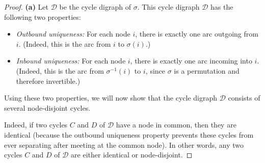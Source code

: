 \begin{proof}
\leanok
\textbf{(a)} Let $\mathcal{D}$ be the cycle digraph of $\sigma$.
This cycle digraph $\mathcal{D}$ has the following two properties:

\begin{itemize}
\item \textit{Outbound uniqueness:} For each node $i$, there is exactly one
arc outgoing from $i$. (Indeed, this is the arc from $i$ to $\sigma\left(
i\right)  $.)

\item \textit{Inbound uniqueness:} For each node $i$, there is exactly one arc
incoming into $i$. (Indeed, this is the arc from $\sigma^{-1}\left(  i\right)
$ to $i$, since $\sigma$ is a permutation and therefore invertible.)
\end{itemize}

Using these two properties, we will now show that the cycle digraph
$\mathcal{D}$ consists of several node-disjoint cycles.

Indeed, if two cycles $C$ and $D$ of
$\mathcal{D}$ have a node in common, then they are identical
(because the outbound
uniqueness property prevents these cycles from ever separating after meeting
at the common node). In other words, any two cycles $C$ and $D$ of
$\mathcal{D}$ are either identical or node-disjoint.


\end{proof}

